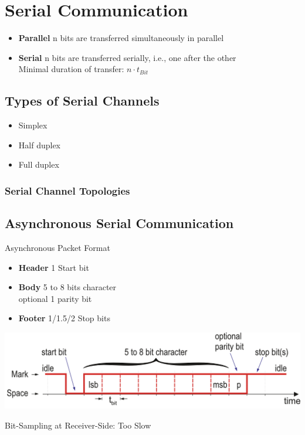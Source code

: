 \section{Serial Communication }

\begin{itemize}
	\itemsep-.5em 
	\item \textbf{Parallel} n bits are transferred simultaneously in parallel
	\item \textbf{Serial} n bits are transferred serially, i.e., one after the other \\ Minimal duration of transfer: $n \cdot t_{Bit}$
\end{itemize}

\subsection{Types of Serial Channels }
\begin{itemize}
	\itemsep-.5em 
	\item Simplex
	\item Half duplex
	\item Full duplex
\end{itemize}

\subsubsection{Serial Channel Topologies}

\subsection{Asynchronous Serial Communication }
Asynchronous Packet Format 
\begin{itemize}
	\itemsep-.5em 
	\item \textbf{Header} 1 Start bit
	\item \textbf{Body} 5 to 8 bits character \\ optional 1 parity bit
	\item \textbf{Footer} 1/1.5/2 Stop bits
\end{itemize}
\includegraphics[width=\columnwidth]{"Images/async_package_format.png"}

Bit-Sampling at Receiver-Side: Too Slow








